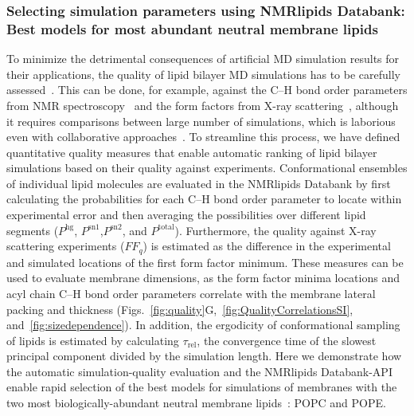 \documentclass[fleqn,10pt]{wlscirep}
\begin{document}
\subsubsection{Selecting simulation parameters using NMRlipids Databank: Best models for most abundant neutral membrane lipids}
%
%
To minimize the detrimental consequences of artificial MD simulation results for their applications, the quality of lipid bilayer MD simulations has to be carefully assessed~\cite{antila22b}. This can be done, for example, against the C--H bond order parameters from NMR spectroscopy~\cite{bacle21,Wur23} and the form factors from X-ray scattering~\cite{ollila16}, although it requires comparisons between large number of simulations, which is laborious even with collaborative approaches~\cite{botan15,catte16,antila19,bacle21}. To streamline this process, we have defined quantitative quality measures that enable automatic ranking of lipid bilayer simulations based on their quality against experiments. Conformational ensembles of individual lipid molecules are evaluated in the NMRlipids Databank by first calculating the probabilities for each C--H bond order parameter to locate within experimental error and then averaging the possibilities over different lipid segments ($P^{\mathrm{hg}}$, $P^{\mathrm{sn1}}$,$P^{\mathrm{sn2}}$, and $P^{\mathrm{total}}$). Furthermore, the quality against X-ray scattering experiments ($FF_q$) is estimated as the difference in the experimental and simulated locations of the first form factor minimum. These measures can be used to evaluate membrane dimensions, as the form factor minima locations and acyl chain C--H bond order parameters correlate with the membrane lateral packing and thickness (Figs.~\ref{fig:quality}G,~\ref{fig:QualityCorrelationsSI}, and~\ref{fig:sizedependence}). In addition, the ergodicity of conformational sampling of lipids is estimated by calculating $\tau_\mathrm{rel}$, the convergence time of the slowest principal component divided by the simulation length. Here we demonstrate how the automatic simulation-quality evaluation and the NMRlipids Databank-API enable rapid selection of the best models for simulations of membranes with the two most biologically-abundant neutral membrane lipids~\cite{vanmeer08}: POPC and POPE.
\end{document}
